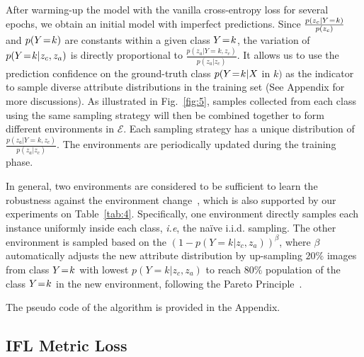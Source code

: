 \documentclass{article}
\def\ie{\emph{i.e}} \def\Ie{\emph{I.e}}
\newcommand\myeq{\mkern1.5mu{=}\mkern1.5mu}
\begin{document}
After warming-up the model with the vanilla cross-entropy loss for several epochs, we obtain an initial model with imperfect predictions. Since $\frac{p(z_c|Y \myeq k)}{p(z_c)}$ and $p(Y \myeq k)$ are constants within a given class $Y \myeq k$, the variation of $p(Y \myeq k|z_c,z_a)$ is directly proportional to $\frac{p(z_a|Y=k,z_c)}{p(z_a|z_c)}$. It allows us to use the prediction confidence on the ground-truth class $p(Y \myeq k|X$ in $k)$ as the indicator to sample diverse attribute distributions in the training set (See Appendix for more discussions). As illustrated in Fig.~\ref{fig:5}, samples collected from each class using the same sampling strategy will then be combined together to form different environments in $\mathcal{E}$. Each sampling strategy has a unique distribution of $\frac{p(z_a|Y=k,z_c)}{p(z_a|z_c)}$. The environments are periodically updated during the training phase.




In general, two environments are considered to be sufficient to learn the robustness against the environment change~\cite{arjovsky2019invariant}, which is also supported by our experiments on Table~\ref{tab:4}. Specifically, one environment directly samples each instance uniformly inside each class, \ie, the na\"ive i.i.d. sampling. The other environment is sampled based on the $(1-p(Y=k|z_c,z_a))^\beta$, where $\beta$ automatically adjusts the new attribute distribution by up-sampling $20\%$ images from class $Y \myeq k$ with lowest $p(Y=k|z_c,z_a)$ to reach $80\%$ population of the class $Y \myeq k$ in the new environment, following the Pareto Principle~\cite{reed2001pareto}. 

The pseudo code of the algorithm is provided in the Appendix.




\subsection{IFL Metric Loss}
\end{document}

